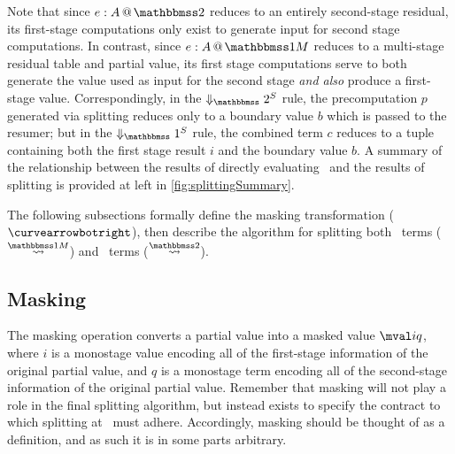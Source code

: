 \begin{abstrsyn}
Note that since $\coltwo e A$ reduces to an entirely second-stage
residual, its first-stage computations only exist to generate input
for second stage computations.  In contrast, since $\colmix e A$
reduces to a multi-stage residual table and partial value, its first
stage computations serve to both generate the value used as input for
the second stage {\em and also} produce a first-stage value.
Correspondingly, in the $\sepredtwosym$ rule, the precomputation $p$
generated via splitting reduces only to a boundary value $b$ which is
passed to the resumer; but in the $\sepredonesym$ rule, the combined
term $c$ reduces to a tuple containing both the first stage result $i$
and the boundary value $b$. A summary of the relationship between the
results of directly evaluating \lang\ and the results of splitting is
provided at left in \ref{fig:splittingSummary}.

The following subsections formally define the masking transformation
($\vsplito$), then describe the algorithm for splitting both
\bbonem\ terms ($\splitonesym$) and \bbtwo\ terms ($\splittwosym$).
  
\subsection{Masking}

The masking operation converts a partial value into a masked value $\mval i q$,
where $i$ is a monostage value encoding all of the first-stage information of the original partial value,
and $q$ is a monostage term encoding all of the second-stage information of the original partial value.
Remember that masking will not play a role in the final splitting algorithm, 
but instead exists to specify the contract to which splitting at \bbonem\ must adhere.
Accordingly, masking should be thought of as a definition, and as such it is in some parts arbitrary.


\end{abstrsyn}
